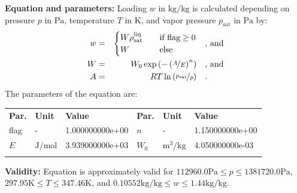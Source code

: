 \textbf{Equation and parameters:}
\newline
%
Loading $w$ in $\si{\kilogram\per\kilogram}$ is calculated depending on pressure $p$ in $\si{\pascal}$, temperature $T$ in $\si{\kelvin}$, and vapor pressure $p_\mathrm{sat}$ in $\si{\pascal}$ by:
%
\begin{equation*}
\begin{split}
w &=& \begin{cases} W \rho_\mathrm{sat}^{\mathrm{liq}} & \quad \text{if flag} \geq 0 \\ W & \quad \text{else} \end{cases} & \quad\text{, and} \\
W &=& W_0 \exp \left( - \left( \nicefrac{A}{E} \right) ^{n} \right) & \quad\text{, and} \\
A &=& R T \ln \left( \nicefrac{p_\mathrm{sat}}{p} \right) & \quad\text{.} \\
\end{split}
\end{equation*}
%
The parameters of the equation are:
%
\begin{longtable}[l]{lll|lll}
\toprule
\addlinespace
\textbf{Par.} & \textbf{Unit} & \textbf{Value} &	\textbf{Par.} & \textbf{Unit} & \textbf{Value} \\
\addlinespace
\midrule
\endhead

\bottomrule
\endfoot
\bottomrule
\endlastfoot
\addlinespace

flag & - & 1.000000000e+00 & $n$ & - & 1.150000000e+00 \\
$E$ & $\si{\joule\per\mole}$ & 3.939000000e+03 & $W_0$ & $\si{\cubic\meter\per\kilogram}$ & 4.050000000e-03 \\

\addlinespace\end{longtable}

\textbf{Validity:}
\newline
Equation is approximately valid for $112960.0 \si{\pascal} \leq p \leq 1381720.0 \si{\pascal}$,  $297.95 \si{\kelvin} \leq T \leq 347.46 \si{\kelvin}$, and $0.10552 \si{\kilogram\per\kilogram} \leq w \leq 1.44 \si{\kilogram\per\kilogram}$.
\newline

